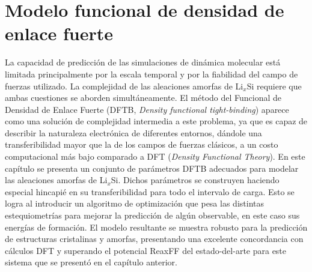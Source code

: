 \chapter{Modelo funcional de densidad de enlace fuerte}\label{ch:modelo}
\thispagestyle{empty}

\vspace{50pt}

\begin{adjustwidth}{50pt}{50pt}
    La capacidad de predicción de las simulaciones de dinámica molecular está 
    limitada principalmente por la escala temporal y por la fiabilidad del campo
    de fuerzas utilizado. La complejidad de las aleaciones amorfas de Li$_x$Si 
    requiere que ambas cuestiones se aborden simultáneamente. El método del 
    Funcional de Densidad de Enlace Fuerte (DFTB, \textit{Density functional 
    tight-binding}) aparece como una solución de complejidad intermedia a este
    problema, ya que es capaz de describir la naturaleza electrónica de diferentes 
    entornos, dándole una transferibilidad mayor que la de los campos de fuerzas clásicos, 
    a un costo computacional más bajo comparado a DFT (\textit{Density Functional
    Theory}). En este capítulo se presenta un conjunto de parámetros DFTB adecuados
    para modelar las aleaciones amorfas de Li$_x$Si. Dichos parámetros se 
    construyen haciendo especial hincapié en su transferibilidad para todo el 
    intervalo de carga. Esto se logra al introducir un algoritmo de optimización 
    que pesa las distintas estequiometrías para mejorar la predicción de algún 
    observable, en este caso sus energías de formación. El modelo resultante se 
    muestra robusto para la predicción de estructuras cristalinas y amorfas, 
    presentando una excelente concordancia con cálculos DFT y superando el 
    potencial ReaxFF del estado-del-arte para este sistema que se presentó en el
    capítulo anterior.
\end{adjustwidth}

\clearpage
\newpage
\thispagestyle{empty}
\mbox{}
\newpage








